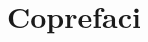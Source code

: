 \documentclass[../Main.tex]{subfiles}
\begin{document}
\cleartoevenpage[\thispagestyle{empty}]
\chapter*{Coprefaci}
\end{document}

